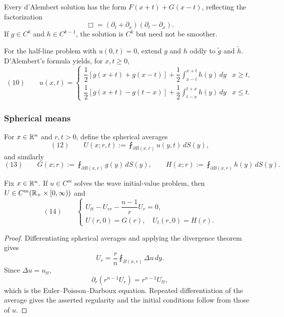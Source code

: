 \begin{remark}
\label{rem:wave-equation-general-solution-1d}

Every d'Alembert solution has the form $F(x+t)+G(x-t)$, reflecting the
factorization
$$\Box=(\partial_t+\partial_x)(\partial_t-\partial_x).$$
If $g\in C^k$ and $h\in C^{k-1}$, the solution is $C^k$ but need not be
smoother.
\end{remark}

For the half-line problem with $u(0,t)=0$, extend $g$ and $h$ oddly to
$\widetilde g$ and $\widetilde h$. D'Alembert's formula yields, for $x,t\ge0$,
$$(10)\qquad
u(x,t)=
\begin{cases}
\dfrac12[g(x+t)+g(x-t)]+\dfrac12\displaystyle\int_{x-t}^{x+t}h(y)\,dy
&x\ge t,\\[8pt]
\dfrac12[g(x+t)-g(t-x)]+\dfrac12\displaystyle\int_{t-x}^{t+x}h(y)\,dy
&x\le t.
\end{cases}$$

\subsubsection{Spherical means}
\label{sec:wave-spherical-means}

For $x\in\mathbb{R}^n$ and $r,t>0$, define the spherical averages
$$(12)\qquad U(x;r,t):=\fint_{\partial B(x,r)}u(y,t)\,dS(y),$$
and similarly
$$(13)\qquad
G(x;r):=\fint_{\partial B(x,r)}g(y)\,dS(y),
\qquad
H(x;r):=\fint_{\partial B(x,r)}h(y)\,dS(y).$$

\begin{lemma}
\label{lem:euler-poisson-darboux-equation}
Fix $x\in\mathbb{R}^n$. If $u\in C^m$ solves the wave initial-value problem, then
$U\in C^m(\mathbb{R}_+\times[0,\infty))$ and
$$(14)\qquad
\begin{cases}
U_{tt}-U_{rr}-\dfrac{n-1}{r}U_r=0,\\
U(r,0)=G(r),\quad U_t(r,0)=H(r).
\end{cases}$$
\end{lemma}
\begin{proof}
\sketch Differentiating spherical averages and applying the divergence theorem
gives
$$U_r=\frac r n\fint_{B(x,r)}\Delta u\,dy.$$
Since $\Delta u=u_{tt}$,
$$\partial_r(r^{n-1}U_r)=r^{n-1}U_{tt},$$
which is the Euler--Poisson--Darboux equation. Repeated differentiation of the
average gives the asserted regularity and the initial conditions follow from
those of $u$.
\end{proof}

